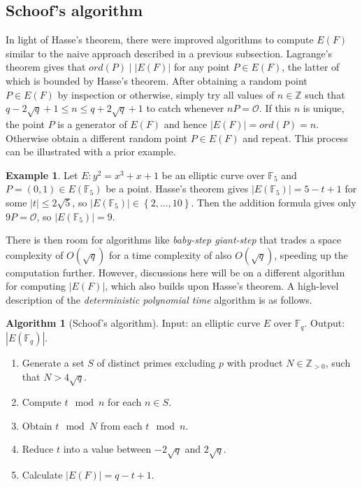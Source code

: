 \documentclass{article}
\newcommand{\F}{\mathbb{F}}
\newcommand{\Z}{\mathbb{Z}}
\newcommand{\rb}[1]{\left( #1 \right)}
\newcommand{\cb}[1]{\left\{ #1 \right\}}
\newcommand{\abs}[1]{\left\lvert #1 \right\rvert}
\theoremstyle{definition}\newtheorem*{definition}{Definition}
\theoremstyle{definition}\newtheorem*{example}{Example}
\theoremstyle{definition}\newtheorem*{remark}{Remark}
\newtheorem{algorithm}[proposition]{Algorithm}
\begin{document}
\pagebreak

\subsection{Schoof's algorithm}

In light of Hasse's theorem, there were improved algorithms to compute $ E\rb{F} $ similar to the naive approach described in a previous subsection. Lagrange's theorem gives that $ ord\rb{P} \mid \abs{E\rb{F}} $ for any point $ P \in E\rb{F} $, the latter of which is bounded by Hasse's theorem. After obtaining a random point $ P \in E\rb{F} $ by inspection or otherwise, simply try all values of $ n \in \Z $ such that $ q - 2\sqrt{q} + 1 \le n \le q + 2\sqrt{q} + 1 $ to catch whenever $ nP = \mathcal{O} $. If this $ n $ is unique, the point $ P $ is a generator of $ E\rb{F} $ and hence $ \abs{E\rb{F}} = ord\rb{P} = n $. Otherwise obtain a different random point $ P \in E\rb{F} $ and repeat. This process can be illustrated with a prior example.

\begin{example}
Let $ E : y^2 = x^3 + x + 1 $ be an elliptic curve over $ \F_5 $ and $ P = \rb{0, 1} \in E\rb{\F_5} $ be a point. Hasse's theorem gives $ \abs{E\rb{\F_5}} = 5 - t + 1 $ for some $ \abs{t} \le 2\sqrt{5} $, so $ \abs{E\rb{\F_5}} \in \cb{2, \dots, 10} $. Then the addition formula gives only $ 9P = \mathcal{O} $, so $ \abs{E\rb{\F_5}} = 9 $.
\end{example}

There is then room for algorithms like \emph{baby-step giant-step} that trades a space complexity of $ O\rb{\sqrt{q}} $ for a time complexity of also $ O\rb{\sqrt{q}} $, speeding up the computation further. However, discussions here will be on a different algorithm for computing $ \abs{E\rb{F}} $, which also builds upon Hasse's theorem. A high-level description of the \emph{deterministic polynomial time} algorithm is as follows.

\begin{algorithm}[Schoof's algorithm]
Input: an elliptic curve $ E $ over $ \F_q $. Output: $ \abs{E\rb{\F_q}} $.
\begin{enumerate}
\item Generate a set $ S $ of distinct primes excluding $ p $ with product $ N \in \Z_{> 0} $, such that $ N > 4\sqrt{q} $.
\item Compute $ t \mod n $ for each $ n \in S $.
\item Obtain $ t \mod N $ from each $ t \mod n $.
\item Reduce $ t $ into a value between $ -2\sqrt{q} $ and $ 2\sqrt{q} $.
\item Calculate $ \abs{E\rb{F}} = q - t + 1 $.
\end{enumerate}
\end{algorithm}
\end{document}
